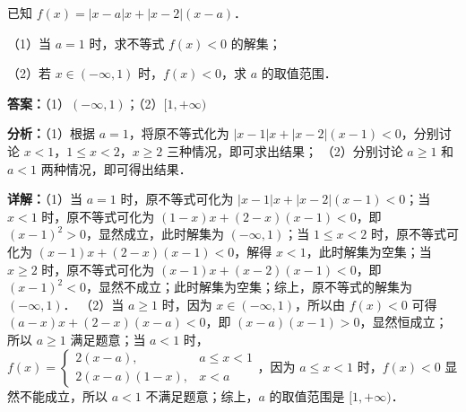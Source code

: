 \begin{question}[points=10]
[选修 4-5：不等式选讲]

已知 $f(x)=|x-a|x+|x-2|(x-a)$．

（1）当 $a=1$ 时，求不等式 $f(x)<0$ 的解集；

（2）若 $x\in(-\infty,1)$ 时，$f(x)<0$，求 $a$ 的取值范围．
\begin{solution}
\textbf{答案：}（1）$(-\infty,1)$；（2）$[1,+\infty)$

\textbf{分析：}（1）根据 $a=1$，将原不等式化为 $|x-1|x+|x-2|(x-1)<0$，分别讨论 $x<1$，$1\le x<2$，$x\ge2$ 三种情况，即可求出结果；
（2）分别讨论 $a\ge1$ 和 $a<1$ 两种情况，即可得出结果．

\textbf{详解：}（1）当 $a=1$ 时，原不等式可化为 $|x-1|x+|x-2|(x-1)<0$；当 $x<1$ 时，原不等式可化为 $(1-x)x+(2-x)(x-1)<0$，即 $(x-1)^2>0$，显然成立，此时解集为 $(-\infty,1)$；当 $1\le x<2$ 时，原不等式可化为 $(x-1)x+(2-x)(x-1)<0$，解得 $x<1$，此时解集为空集；当 $x\ge2$ 时，原不等式可化为 $(x-1)x+(x-2)(x-1)<0$，即 $(x-1)^2<0$，显然不成立；此时解集为空集；综上，原不等式的解集为 $(-\infty,1)$．
（2）当 $a\ge1$ 时，因为 $x\in(-\infty,1)$，所以由 $f(x)<0$ 可得 $(a-x)x+(2-x)(x-a)<0$，即 $(x-a)(x-1)>0$，显然恒成立；所以 $a\ge1$ 满足题意；当 $a<1$ 时，$f(x)=\begin{cases}2(x-a), & a\le x<1 \\ 2(x-a)(1-x), & x<a\end{cases}$，因为 $a\le x<1$ 时，$f(x)<0$ 显然不能成立，所以 $a<1$ 不满足题意；综上，$a$ 的取值范围是 $[1,+\infty)$．
\end{solution}
\end{question}

